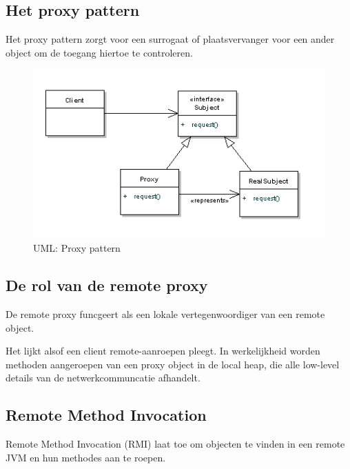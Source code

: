 \documentclass[a4paper,12pt]{article}
\begin{document}
\subsection{Het proxy pattern}
Het proxy pattern zorgt voor een surrogaat of plaatsvervanger voor een ander object om de toegang hiertoe te controleren.
\begin{figure}[H]
\centering
  	\includegraphics[width=.44\linewidth]{img/Proxy/ProxyPattern.png}
  	\caption{UML: Proxy pattern}
  	\label{fig:Proxy}
\end{figure}

\subsection{De rol van de remote proxy}
De remote proxy funcgeert als een lokale vertegenwoordiger van een remote object.

Het lijkt alsof een client remote-aanroepen pleegt.
In werkelijkheid worden methoden aangeroepen van een proxy object in de local heap, die alle low-level details van de netwerkcommuncatie afhandelt.

\subsection{Remote Method Invocation}
Remote Method Invocation (RMI) laat toe om objecten te vinden in een remote JVM en hun methodes aan te roepen.
\end{document}
